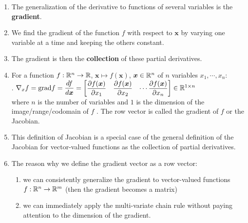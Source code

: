 \begin{enumerate}
    \item The generalization of the derivative to functions of several variables is the \textbf{gradient}.
    \hfill \cite{mfml/book/mml/Deisenroth-Faisal-Ong}

    \item We find the gradient of the function $f$ with respect to $\bm{x}$ by varying one variable at a time and keeping the others constant.
    \hfill \cite{mfml/book/mml/Deisenroth-Faisal-Ong}

    \item The gradient is then the \textbf{collection} of these partial derivatives.
    \hfill \cite{mfml/book/mml/Deisenroth-Faisal-Ong}

    \item
    \begin{definition}
        For a function $f : \mathbb{R}^n \to \mathbb{R}$, $\bm{x} \mapsto f (\bm{x})$, $\bm{x} \in \mathbb{R}^n$ of $n$ variables $x_1, \cdots , x_n$:
        \\
        .\hfill
        $
            \nabla_x f
            = \text{grad} f
            = \dfrac{df}{d\bm{x}}
            = \begin{bmatrix}
                \dfrac{\partial f(\bm{x})}{\partial x_1} &
                \dfrac{\partial f(\bm{x})}{\partial x_2} &
                \cdots
                \dfrac{\partial f(\bm{x})}{\partial x_n}
            \end{bmatrix}
            \in \mathbb{R}^{1 \times n}
        $
        \hfill \cite{mfml/book/mml/Deisenroth-Faisal-Ong}
        \\
        where $n$ is the number of variables and $1$ is the dimension of the image/range/codomain of $f$ .
        The row vector is called the gradient of $f$ or the Jacobian.
        \hfill \cite{mfml/book/mml/Deisenroth-Faisal-Ong}
    \end{definition}

    \item This definition of Jacobian is a special case of the general definition of the Jacobian for vector-valued functions as the collection of partial derivatives.
    \hfill \cite{mfml/book/mml/Deisenroth-Faisal-Ong}

    \item The reason why we define the gradient vector as a row vector:
    \hfill \cite{mfml/book/mml/Deisenroth-Faisal-Ong}
    \begin{enumerate}
        \item we can consistently generalize the gradient to vector-valued functions $f : \mathbb{R}^n \to \mathbb{R}^m$ (then the gradient becomes a matrix)
        \hfill \cite{mfml/book/mml/Deisenroth-Faisal-Ong}

        \item we can immediately apply the multi-variate chain rule without paying attention to the dimension of the gradient.
        \hfill \cite{mfml/book/mml/Deisenroth-Faisal-Ong}
    \end{enumerate}
\end{enumerate}






